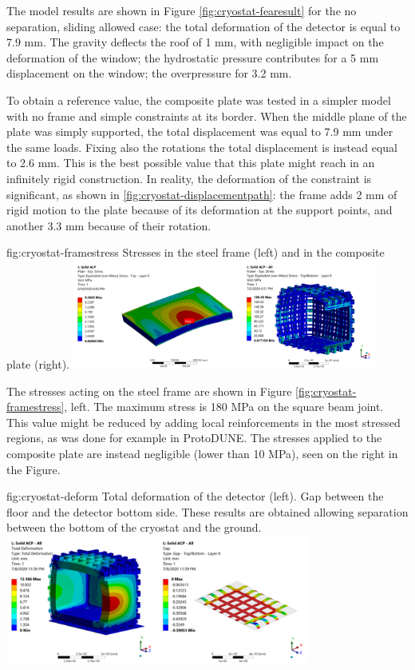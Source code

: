 The model results are shown in Figure \ref{fig:cryostat-fearesult} for the no separation, sliding allowed case: the total deformation of the detector is equal to 7.9 mm. The gravity deflects the roof of 1 mm, with negligible impact on the deformation of the window; the hydrostatic pressure contributes for a 5 mm displacement on the window; the overpressure for 3.2 mm.

To obtain a reference value, the composite plate was tested in a simpler model with no frame and simple constraints at its border. When the middle plane of the plate was simply supported, the total displacement was equal to 7.9 mm under the same loads. Fixing also the rotations the total displacement is instead equal to 2.6 mm. This is the best possible value that this plate might reach in an infinitely rigid construction. In reality, the deformation of the constraint is significant, as shown in \ref{fig:cryostat-displacementpath}: the frame adds 2 mm of rigid motion to the plate because of its deformation at the support points, and another 3.3 mm because of their rotation.

\begin{dunefigure}{fig:cryostat-framestress}
{Stresses in the steel frame (left) and in the composite plate (right).}
\includegraphics[width=0.75\textwidth]{graphics/cryostat/cryostat-framestress.png}
\end{dunefigure}

The stresses acting on the steel frame are shown in Figure \ref{fig:cryostat-framestress}, left. The maximum stress is 180 MPa on the square beam joint. This value might be reduced by adding local reinforcements in the most stressed regions, as was done for example in ProtoDUNE. The stresses applied to the composite plate are instead negligible (lower than 10 MPa), seen on the right in the Figure.

\begin{dunefigure}{fig:cryostat-deform}
{Total deformation of the detector (left). Gap between the floor and the detector bottom side. These results are obtained allowing separation between the bottom of the cryostat and the ground.}
\includegraphics[width=0.75\textwidth]{graphics/cryostat/cryostat-deform.png}
\end{dunefigure}

